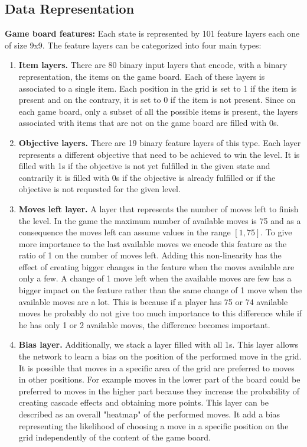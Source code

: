 \subsection{Data Representation}\label{data_representation}
\textbf{Game board features:} Each state is represented by 101 feature layers each one of size 9x9. The feature layers can be categorized into four main types:
\begin{enumerate}
    \item \textbf{Item layers.} There are 80 binary input layers that encode, with a binary representation, the items on the game board. Each of these layers is associated to a single item. Each position in the grid is set to 1 if the item is present and on the contrary, it is set to 0 if the item is not present. Since on each game board, only a subset of all the possible items is present, the layers associated with items that are not on the game board are filled with 0s.
    
    \item \textbf{Objective layers.} There are 19 binary feature layers of this type. Each layer represents a different objective that need to be achieved to win the level. It is filled with 1s if the objective is not yet fulfilled in the given state and contrarily it is filled with 0s if the objective is already fulfilled or if the objective is not requested for the given level.
    
    \item \textbf{Moves left layer.} A layer that represents the number of moves left to finish the level. In the game the maximum number of available moves is 75 and as a consequence the moves left can assume values in the range $\left[1,75\right]$. To give more importance to the last available moves we encode this feature as the ratio of 1 on the number of moves left. Adding this non-linearity has the effect of creating bigger changes in the feature when the moves available are only a few. A change of 1 move left when the available moves are few has a bigger impact on the feature rather than the same change of 1 move when the available moves are a lot. This is because if a player has 75 or 74 available moves he probably do not give too much importance to this difference while if he has only 1 or 2 available moves, the difference becomes important.
    
    \item \textbf{Bias layer.} Additionally, we stack a layer filled with all 1s. This layer allows the network to learn a bias on the position of the performed move in the grid. It is possible that moves in a specific area of the grid are preferred to moves in other positions. For example moves in the lower part of the board could be preferred to moves in the higher part because they increase the probability of creating cascade effects and obtaining more points. This layer can be described as an overall "heatmap" of the performed moves. It add a bias representing the likelihood of choosing a move in a specific position on the grid independently of the content of the game board.
\end{enumerate} 
